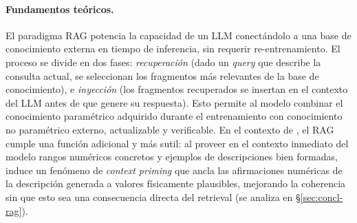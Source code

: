 \paragraph{Fundamentos teóricos.} El paradigma RAG potencia la
capacidad de un LLM conectándolo a una base de conocimiento externa en tiempo de
inferencia, sin requerir re-entrenamiento. El proceso se divide en dos fases:
\emph{recuperación} (dado un \emph{query} que describe la consulta actual, se
seleccionan los fragmentos más relevantes de la base de conocimiento), e
\emph{inyección} (los fragmentos recuperados se insertan en el contexto del LLM
antes de que genere su respuesta). Esto permite al modelo combinar el
conocimiento paramétrico adquirido durante el entrenamiento con conocimiento
no paramétrico externo, actualizable y verificable. En el contexto de
\STELLAR{}, el RAG cumple una función adicional y más sutil: al proveer en el
contexto inmediato del modelo rangos numéricos concretos y ejemplos de
descripciones bien formadas, induce un fenómeno de \emph{context priming} que
ancla las afirmaciones numéricas de la descripción generada a valores físicamente
plausibles, mejorando la coherencia sin que esto sea una consecuencia directa del
retrieval (se analiza en §\ref{sec:concl-rag}).

